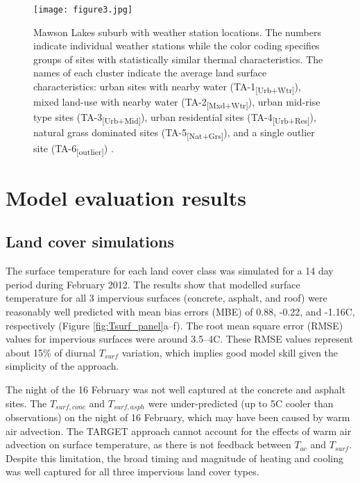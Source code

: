 \documentclass[gmd, manuscript]{copernicus}
\begin{document}
\begin{figure}[!htbp]
\begin{center}
\texttt{[image: figure3.jpg]}
 \caption{Mawson Lakes suburb with weather station locations. The numbers indicate individual weather stations while the color coding specifies groups of sites with statistically similar thermal characteristics.  The  names of each cluster indicate the average land surface characteristics: urban sites with nearby water ({TA-1\textsubscript{[Urb+Wtr]}}), mixed land-use with nearby water ({TA-2\textsubscript{[Mxd+Wtr]}}), urban mid-rise type sites ({TA-3\textsubscript{[Urb+Mid]}}), urban residential sites ({TA-4\textsubscript{[Urb+Res]}}), natural grass dominated sites ({TA-5\textsubscript{[Nat+Grs]}}), and a single outlier site (TA-6\textsubscript{[outlier]})  \citep{Broadbent2017}.} \label{fig:mawson}
\end{center} 
\end{figure}




\section{Model evaluation results}\label{sec:Results} 
\subsection{Land cover simulations}\label{sec:landcoverresult} 


The surface temperature for each land cover class was simulated for a 14 day period during February 2012. The results show that modelled surface temperature for all 3 impervious surfaces (concrete, asphalt, and roof) were reasonably well predicted with mean bias errors (MBE) of 0.88, -0.22, and -1.16\degree C, respectively (Figure \ref{fig:Tsurf_panel}a--f). The root mean square error (RMSE) values for impervious surfaces were around 3.5--4\degree C. These RMSE values represent about 15\% of diurnal $T_{surf}$ variation, which implies good model skill given the simplicity of the approach.  



The night of the 16 February was not well captured at the concrete and asphalt sites. The $T_{surf,conc}$ and $T_{surf,asph}$ were under-predicted (up to 5\degree C cooler than observations) on the night of 16 February, which may have been caused by warm air advection. The TARGET approach  cannot account for the effects of warm air advection on surface temperature, as there is not feedback between $T_{ac}$ and $T_{surf}$.  Despite this limitation, the broad timing and magnitude of heating and cooling was well captured for all three impervious land cover types. 
\end{document}
